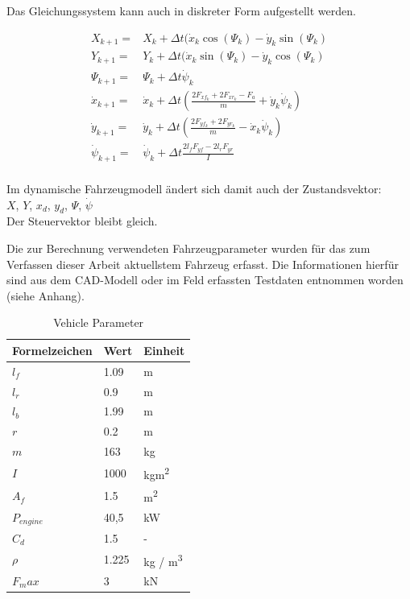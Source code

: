 \documentclass{like}
\begin{document}
Das Gleichungssystem kann auch in diskreter Form aufgestellt werden.

\begin{eqnarray}
X_{k+1} =& X_k + \Delta t(\dot{x}_k \cos(\Psi_k) - \dot{y}_k \sin(\Psi_k) \\
Y_{k+1} =& Y_{k} + \Delta t(\dot{x}_k \sin(\Psi_k) - \dot{y}_k \cos(\Psi_k) \\
\Psi_{k+1} =& \Psi_k + \Delta t \dot{\psi}_k \\
\dot{x}_{k+1} =&  \dot{x}_k + \Delta t (\frac{2F_{xf_k} + 2 F_{xr_k}- F_a}{m} + \dot{y}_k \dot{\psi}_k) \\
\dot{y}_{k+1} =&  \dot{y}_k + \Delta t (\frac{2 F_{yf_k} + 2 F_{yr_k}}{m} - \dot{x}_k \dot{\psi}_k)  \\
\dot{\psi}_{k+1} =& \dot{\psi}_k + \Delta t \frac{2 l_f F_{yf} - 2 l_r F_{yr}}{I} \\
\end{eqnarray}

Im dynamische Fahrzeugmodell ändert sich damit auch der Zustandsvektor: \\
\(X\), \(Y\), \(x_d\), \(y_d\), \(\Psi\), \(\dot{\psi}\) \\
Der Steuervektor bleibt gleich.

Die zur Berechnung verwendeten Fahrzeugparameter wurden für das zum Verfassen dieser Arbeit aktuellstem Fahrzeug erfasst. Die Informationen hierfür sind aus dem CAD-Modell oder im Feld erfassten Testdaten entnommen worden (siehe Anhang).


\begin{table}[]
	\centering
	\begin{tabular}{l|l|l}
		\hline
		Formelzeichen	& Wert & Einheit \\ \hline
		\(l_f\)	&	1.09 & m\\
		\(l_r\)	&	0.9 & m\\
		\(l_b\)	&	1.99 & m \\
		\(r\)	&	0.2 & m \\
		\(m\)	&  	163 & kg\\
		\(I\)	&  	1000 & kgm\textsuperscript{2}\\
		\(A_f\)	&  	1.5 & m\textsuperscript{2}\\
		\(P_{engine}\) &  40,5 & kW\\
		\(C_d\)	&  	1.5 & - \\
		\(\rho\)	&  	1.225 & kg / m\textsuperscript{3}\\
		\(F_max\)	&  	3 & kN \\ 
	\end{tabular}
	\caption{Vehicle Parameter}
	\label{vehicleParam}
\end{table}
\end{document}
